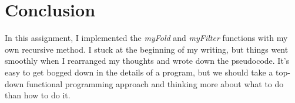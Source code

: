 \documentclass{article}
\begin{document}
\section{Conclusion}

In this assignment, I implemented the \emph{myFold} and \emph{myFilter} functions with my own recursive method. I stuck at the beginning of my writing, but things went smoothly when I rearranged my thoughts and wrote down the pseudocode. It's easy to get bogged down in the details of a program, but we should take a top-down functional programming approach and thinking more about what to do than how to do it.









\end{document}

